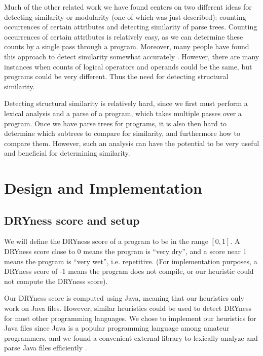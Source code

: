 \documentclass{article}
\begin{document}
Much of the other related work we have found centers on two different ideas for detecting similarity or modularity
(one of which was just described): counting occurrences
of certain attributes and detecting similarity of parse trees. Counting occurrences of certain attributes is relatively easy, as we can
determine these counts by a single pass through a program. Moreover, many people have found this approach to detect similarity 
somewhat accurately \cite{Modularity1979}\cite{PlagiarismProgrammingAssignments}. However, there are many instances when counts of
logical operators and operands could be the same, but programs could be very different. Thus the need for detecting structural similarity.

Detecting structural similarity is relatively hard, since we first must perform a lexical analysis and a parse of a program, which takes
multiple passes over a program. Once we have parse trees for programs, it is also then hard to determine which subtrees to compare for
similarity, and furthermore how to compare them. However, such an analysis can have the potential to be very useful and beneficial
for determining similarity\cite{ProgramSimilarityPopulations}\cite{PlagiarismProgrammingAssignments}.

\section{Design and Implementation}

\subsection{DRYness score and setup}

We will define the DRYness score of a program to be in the range $[0,1]$. A DRYness score close to 0 means the program is ``very dry'',
and a score near 1 means the program is ``very wet'', i.e. repetitive. (For implementation purposes, a DRYness score of -1 means the
program does not compile, or our heuristic could not compute the DRYness score).

Our DRYness score is computed using Java, meaning that our heuristics only work on Java files. However, similar heuristics could 
be used to detect DRYness for most other programming languages. We chose to implement our heuristics for Java files since Java 
is a popular programming language among amateur programmers, and we found a convenient external library to lexically analyze and parse
Java files efficiently \cite{Javaparser}.
\end{document}
